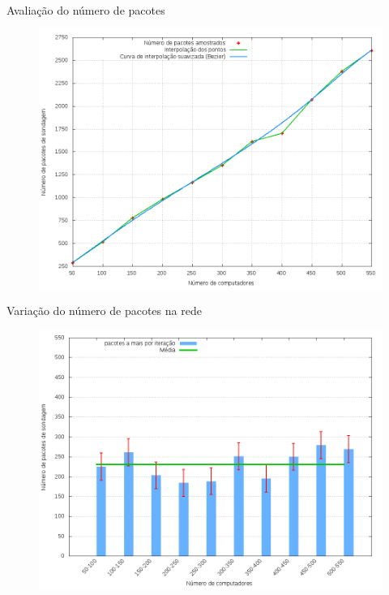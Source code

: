 \begin{frame}{Avaliação do número de pacotes}

    \begin{figure}[!htb]
        \centering
        \includegraphics[scale=.35]{images/npings}
    \end{figure}
\end{frame}


\begin{frame}{Variação do número de pacotes na rede}

    \begin{figure}[!htb]
        \centering
        \includegraphics[scale=.35]{images/npings-stats}
    \end{figure}
\end{frame}


